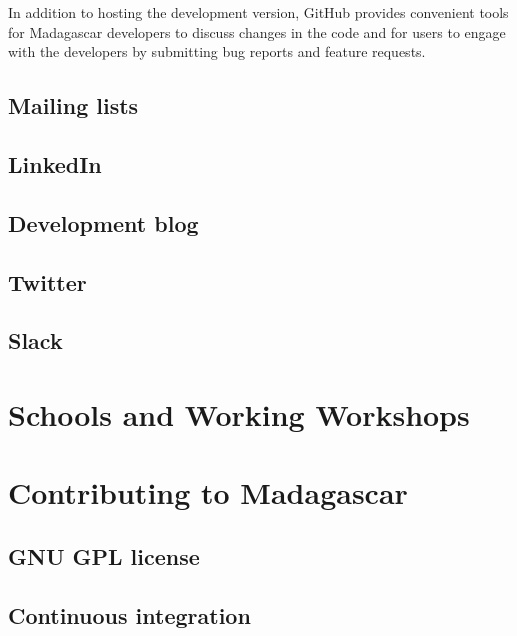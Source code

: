 In addition to hosting the development version, GitHub provides
convenient tools for Madagascar developers to discuss changes in the
code and for users to engage with the developers by submitting bug
reports and feature requests. 

\subsection{Mailing lists}

\subsection{LinkedIn}

\subsection{Development blog}

\subsection{Twitter}

\subsection{Slack}

\section{Schools and Working Workshops}

\section{Contributing to Madagascar}

\subsection{GNU GPL license}

\subsection{Continuous integration}
